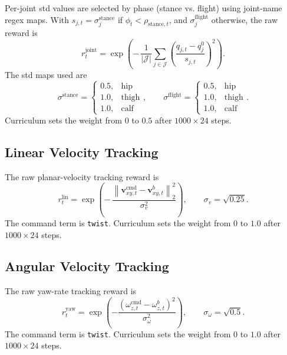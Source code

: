 \documentclass[11pt, a4paper]{article}
\begin{document}
Per-joint std values are selected by phase (stance vs. flight) using joint-name
regex maps. With $s_{j,t} = \sigma^{\mathrm{stance}}_j$ if $\phi_t <
\rho_{\mathrm{stance},t}$, and $\sigma^{\mathrm{flight}}_j$ otherwise, the raw
reward is
\begin{equation}
    r^{\mathrm{joint}}_t =
    \exp\!\left(
        -\,\frac{1}{|\mathcal{J}|}
        \sum_{j \in \mathcal{J}}
        \left(
            \frac{q_{j,t} - q^{0}_{j}}{s_{j,t}}
        \right)^{2}
    \right).
\end{equation}
The std maps used are
\begin{equation}
    \sigma^{\mathrm{stance}} =
    \begin{cases}
        0.5, & \text{hip} \\
        1.0, & \text{thigh} \\
        1.0, & \text{calf}
    \end{cases},
    \qquad
    \sigma^{\mathrm{flight}} =
    \begin{cases}
        0.5, & \text{hip} \\
        1.0, & \text{thigh} \\
        1.0, & \text{calf}
    \end{cases}.
\end{equation}
Curriculum sets the weight from $0$ to $0.5$ after $1000 \times 24$ steps.

\subsection{Linear Velocity Tracking}

The raw planar-velocity tracking reward is
\begin{equation}
    r^{\mathrm{lin}}_t =
    \exp\!\left(
        -\,
        \frac{
            \left\lVert
                \bm{v}^{\mathrm{cmd}}_{xy,t} - \bm{v}^{b}_{xy,t}
            \right\rVert_2^{2}
        }{
            \sigma_{v}^{2}
        }
    \right),
    \qquad
    \sigma_{v} = \sqrt{0.25}.
\end{equation}
The command term is \texttt{twist}. Curriculum sets the weight from $0$ to
$1.0$ after $1000 \times 24$ steps.

\subsection{Angular Velocity Tracking}

The raw yaw-rate tracking reward is
\begin{equation}
    r^{\mathrm{yaw}}_t =
    \exp
    \left(
        -
        \frac{
            \left(
                \omega^{\mathrm{cmd}}_{z,t}
                -
                \omega^{b}_{z,t}
            \right)^2
        }{
            \sigma_{\omega}^{2}
        }
    \right),
    \qquad
    \sigma_{\omega} = \sqrt{0.5}.
\end{equation}
The command term is \texttt{twist}. Curriculum sets the weight from $0$ to
$1.0$ after $1000 \times 24$ steps.
\end{document}

